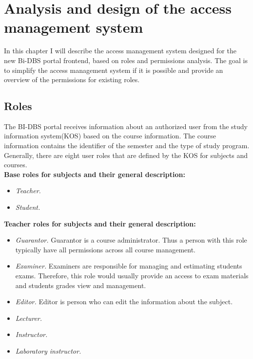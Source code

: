 \chapter{Analysis and design of the access management system} In this chapter I will describe the access management system designed for the new Bi-DBS portal frontend, based on roles and permissions analysis. The goal is to simplify the access management system if it is possible and provide an overview of the permissions for existing roles.


\section{Roles} The BI-DBS portal receives information about an authorized user from the study information system(KOS) based on the course information. The course information contains the identifier of the semester and the type of study program. Generally, there are eight user roles that are defined by the KOS for subjects and courses.\\

\noindent \textbf{Base roles for subjects and their general description:}

\begin{itemize}
    \item \emph{Teacher.} 
    \item \emph{Student.} 
\end{itemize}

\noindent \textbf{Teacher roles for subjects and their general description:}

\begin{itemize}
    \item \emph{Guarantor.} Guarantor is a course administrator. Thus a person with this role typically have all permissions across all course management.
    \item \emph{Examiner.} Examiners are responsible for managing and estimating students exams. Therefore, this role would usually provide an access to exam materials and students grades view and management.
    \item \emph{Editor.} Editor is person who can edit the information about the subject.
    \item \emph{Lecturer.} 
    \item \emph{Instructor.} 
    \item \emph{Laboratory instructor.}
\end{itemize}


